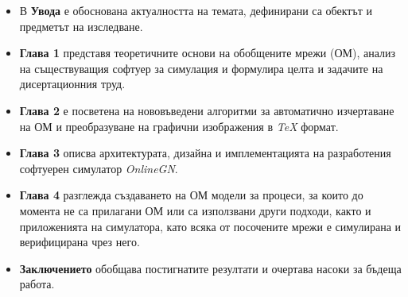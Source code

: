 \begin{flushleft}
\begin{itemize}
	\item В \textbf{Увода} е обоснована актуалността на темата, дефинирани са обектът и предметът на изследване.
	\item \textbf{Глава 1} представя теоретичните основи на обобщените мрежи (ОМ), анализ на съществуващия софтуер за симулация и формулира целта и задачите на дисертационния труд.
	\item \textbf{Глава 2} е посветена на нововъведени алгоритми за автоматично изчертаване на ОМ и преобразуване на графични изображения в \textit{TeX} формат.
	\item \textbf{Глава 3} описва архитектурата, дизайна и имплементацията на разработения софтуерен симулатор \textit{OnlineGN}.
	\item \textbf{Глава 4} разглежда създаването на ОМ модели за процеси, за които до момента не са прилагани ОМ или са използвани други подходи, както и приложенията на симулатора, като всяка от посочените мрежи е симулирана и верифицирана чрез него.
	\item \textbf{Заключението} обобщава постигнатите резултати и очертава насоки за бъдеща работа.
\end{itemize}


\end{flushleft}

\newpage


\newpage
{}
\pagestyle{fancy}
\fancyhf{}
\fancyfoot[R]{\thepage}
\setcounter{page}{2}
\renewcommand{\contentsname}{\Large Съдържание\vspace*{-0.5cm}}

\newpage
\tableofcontents  
